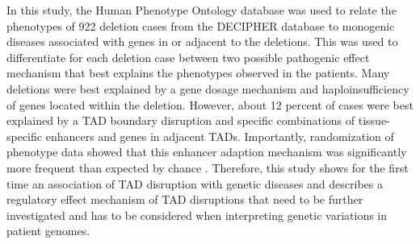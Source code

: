 \documentclass[a4paper,twoside=true,openright,parskip=full,chapterprefix=true,11pt,headings=normal,bibliography=totoc,listof=totoc,titlepage=on,captions=tableabove,draft=false]{scrreprt}
\theoremstyle{definition}
\theoremstyle{definition}
\theoremstyle{definition}
\theoremstyle{remark}
\begin{document}
In this study, the Human Phenotype Ontology database \citep{Kohler2014}
was used to relate the phenotypes of 922 deletion cases from the
DECIPHER database \citep{Firth2009} to monogenic diseases associated
with genes in or adjacent to the deletions. This was used to
differentiate for each deletion case between two possible pathogenic
effect mechanism that best explains the phenotypes observed in the
patients. Many deletions were best explained by a gene dosage mechanism
and haploinsufficiency of genes located within the deletion. However,
about 12 percent of cases were best explained by a TAD boundary
disruption and specific combinations of tissue-specific enhancers and
genes in adjacent TADs. Importantly, randomization of phenotype data
showed that this enhancer adaption mechanism was significantly more
frequent than expected by chance \citep{Ibn-Salem2014}. Therefore, this
study shows for the first time an association of TAD disruption with
genetic diseases and describes a regulatory effect mechanism of TAD
disruptions that need to be further investigated and has to be
considered when interpreting genetic variations in patient genomes.
\end{document}
